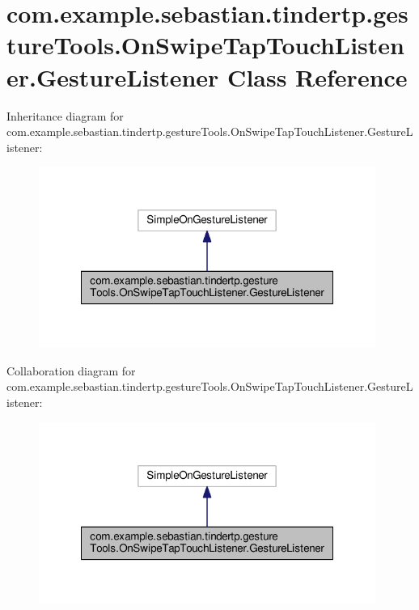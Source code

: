 \hypertarget{classcom_1_1example_1_1sebastian_1_1tindertp_1_1gestureTools_1_1OnSwipeTapTouchListener_1_1GestureListener}{}\section{com.\+example.\+sebastian.\+tindertp.\+gesture\+Tools.\+On\+Swipe\+Tap\+Touch\+Listener.\+Gesture\+Listener Class Reference}
\label{classcom_1_1example_1_1sebastian_1_1tindertp_1_1gestureTools_1_1OnSwipeTapTouchListener_1_1GestureListener}


Inheritance diagram for com.\+example.\+sebastian.\+tindertp.\+gesture\+Tools.\+On\+Swipe\+Tap\+Touch\+Listener.\+Gesture\+Listener\+:\nopagebreak
\begin{figure}[H]
\begin{center}
\leavevmode
\includegraphics[width=312pt]{classcom_1_1example_1_1sebastian_1_1tindertp_1_1gestureTools_1_1OnSwipeTapTouchListener_1_1GestureListener__inherit__graph}
\end{center}
\end{figure}


Collaboration diagram for com.\+example.\+sebastian.\+tindertp.\+gesture\+Tools.\+On\+Swipe\+Tap\+Touch\+Listener.\+Gesture\+Listener\+:\nopagebreak
\begin{figure}[H]
\begin{center}
\leavevmode
\includegraphics[width=312pt]{classcom_1_1example_1_1sebastian_1_1tindertp_1_1gestureTools_1_1OnSwipeTapTouchListener_1_1GestureListener__coll__graph}
\end{center}
\end{figure}
